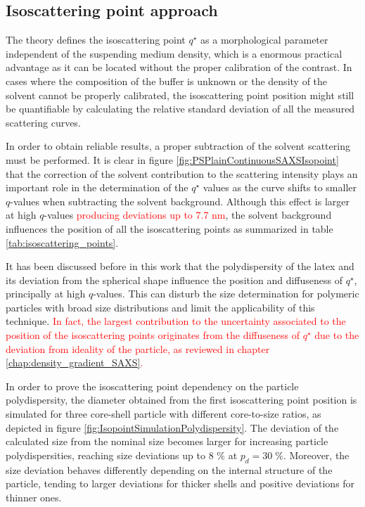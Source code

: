 \subsection{Isoscattering point approach}
\label{sec:EvaluationIsopoint}

The theory defines the isoscattering point $q^{\star}$ as a morphological parameter independent of the suspending medium density, which is a enormous practical advantage as it can be located without the proper calibration of the contrast. In cases where the composition of the buffer is unknown or the density of the solvent cannot be properly calibrated, the isoscattering point position might still be quantifiable by calculating the relative standard deviation of all the measured scattering curves.

In order to obtain reliable results, a proper subtraction of the solvent scattering must be performed. It is clear in figure \ref{fig:PSPlainContinuousSAXSIsopoint} that the correction of the solvent contribution to the scattering intensity plays an important role in the determination of the $q^{\star}$ values as the curve shifts to smaller $q$-values when subtracting the solvent background. Although this effect is larger at high $q$-values \textcolor{red}{producing deviations up to 7.7 nm}, the solvent background influences the position of all the isoscattering points as summarized in table \ref{tab:isoscattering_points}.

It has been discussed before in this work that the polydispersity of the latex and its deviation from the spherical shape influence the position and diffuseness of $q^{\star}$, principally at high $q$-values. This can disturb the size determination for polymeric particles with broad size distributions and limit the applicability of this technique. \textcolor{red}{In fact, the largest contribution to the uncertainty associated to the position of the isoscattering points originates from the diffuseness of $q^{\star}$ due to the deviation from ideality of the particle, as reviewed in chapter \ref{chap:density_gradient_SAXS}.}

In order to prove the isoscattering point dependency on the particle polydispersity, the diameter obtained from the first isoscattering point position is simulated for three core-shell particle with different core-to-size ratios, as depicted in figure \ref{fig:IsopointSimulationPolydispersity}. The deviation of the calculated size from the nominal size becomes larger for increasing particle polydispersities, reaching size deviations up to 8 $\%$ at $p_d = 30\;\%$. Moreover, the size deviation behaves differently depending on the internal structure of the particle, tending to larger deviations for thicker shells and positive deviations for thinner ones.

